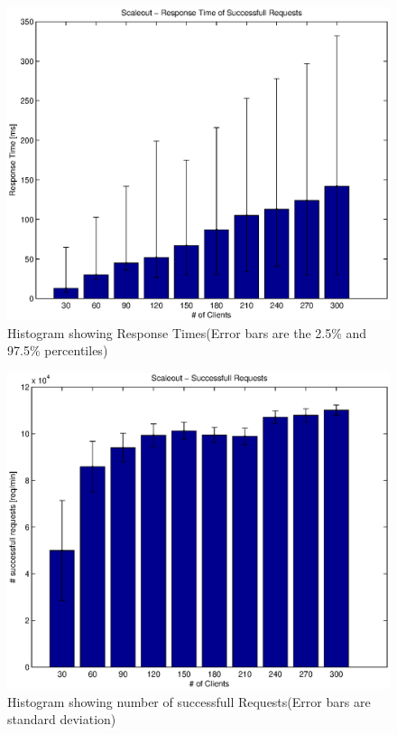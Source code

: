 \documentclass[a4paper]{article}
\begin{document}
\begin{figure}[H]
	\begin{center}
    \includegraphics[scale=0.6]{../plots-ms2-mg/experiment-rt.eps}
  \end{center}
  \caption{Histogram showing Response Times\newline(Error bars are the 2.5\% and 97.5\% percentiles)}
  \label{fig:experiment-rt}
\end{figure}




\begin{figure}[H]
	\begin{center}
    \includegraphics[scale=0.6]{../plots-ms2-mg/experiment-tp.eps}
  \end{center}
  \caption{Histogram showing number of successfull Requests\newline(Error bars are standard deviation)}
  \label{fig:experiment-tp}
\end{figure}
\end{document}
